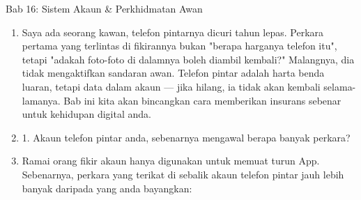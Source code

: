 \begin{tcbpractice}{Bab 16: Sistem Akaun \& Perkhidmatan Awan}
\begin{enumerate}
  \item Saya ada seorang kawan, telefon pintarnya dicuri tahun lepas. Perkara pertama yang terlintas di fikirannya bukan "berapa harganya telefon itu", tetapi "adakah foto-foto di dalamnya boleh diambil kembali?" Malangnya, dia tidak mengaktifkan sandaran awan. Telefon pintar adalah harta benda luaran, tetapi data dalam akaun — jika hilang, ia tidak akan kembali selama-lamanya. Bab ini kita akan bincangkan cara memberikan insurans sebenar untuk kehidupan digital anda.
  \item 1. Akaun telefon pintar anda, sebenarnya mengawal berapa banyak perkara?
  \item Ramai orang fikir akaun hanya digunakan untuk memuat turun App. Sebenarnya, perkara yang terikat di sebalik akaun telefon pintar jauh lebih banyak daripada yang anda bayangkan:
\end{enumerate}

\end{tcbpractice}
